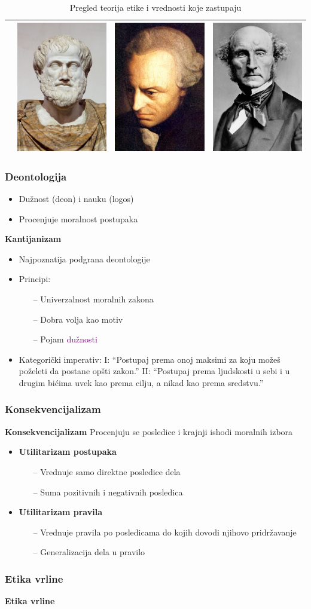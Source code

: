 \documentclass[pdf]{beamer}
\begin{document}
\begin{frame}
\begin{table}
\begin{center}
\begin{tabular}{|l|c|c|c|}
& \includegraphics[scale=.1]{slike/aristotel.jpg} & \includegraphics[scale=.1]{slike/kant.jpg} & \includegraphics[scale=.1]{slike/mil.jpg} \\
\hline
\end{tabular}
\label{tab:tabela1}
\caption{{Pregled teorija etike i vrednosti koje zastupaju}}
\end{center}
\end{table}

\end{frame}

\begin{frame}
\frametitle{Deontologija}

\begin{itemize}
\item{Dužnost (deon) i nauku (logos)}
\item{Procenjuje moralnost postupaka}
\end{itemize}
\textbf{Kantijanizam}
\begin{itemize}
\item{Najpoznatija podgrana deontologije}
\item{Principi:}
	\begin{itemize}
	\item[--]{Univerzalnost moralnih zakona}
	\item[--]{Dobra volja kao motiv}
	\item[--]{Pojam \textcolor{purple}{dužnosti}} 
	\end{itemize}
\item{Kategorički imperativ:\newline
I: ``Postupaj prema onoj maksimi za koju možeš poželeti da postane opšti zakon.''\newline
II: ``Postupaj prema ljudskosti u sebi i u drugim bićima uvek kao prema cilju, a nikad kao prema sredstvu.''}
\end{itemize} 

\end{frame}
\begin{frame}
\frametitle{Konsekvencijalizam}

\textbf{Konsekvencijalizam}\newline
Procenjuju se posledice i krajnji ishodi moralnih izbora
\begin{itemize}
\item{\textbf{Utilitarizam postupaka}}
	\begin{itemize}
	\item[--]{Vrednuje samo direktne posledice dela}
	\item[--]{Suma pozitivnih i negativnih posledica}
	\end{itemize}
\item{\textbf{Utilitarizam pravila}}
	\begin{itemize}
	\item[--]{Vrednuje pravila po posledicama do kojih dovodi njihovo pridržavanje}
	\item[--]{Generalizacija dela u pravilo}
	\end{itemize}
\end{itemize}


\end{frame}
\begin{frame}
\frametitle{Etika vrline}

\textbf{Etika vrline}
\begin{itemize}
\item{Pojmovi ključni za moralan život - edukacija, mudrost, društvene veze, uloga emocija
\end{itemize}
\end{frame}
\end{document}
